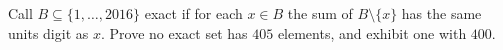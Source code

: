 Call $B\subseteq\{1,\ldots,2016\}$ exact if for each $x\in B$ the sum of $B\setminus\{x\}$ has the same units digit as $x$. Prove no exact set has $405$ elements, and exhibit one with $400$.

